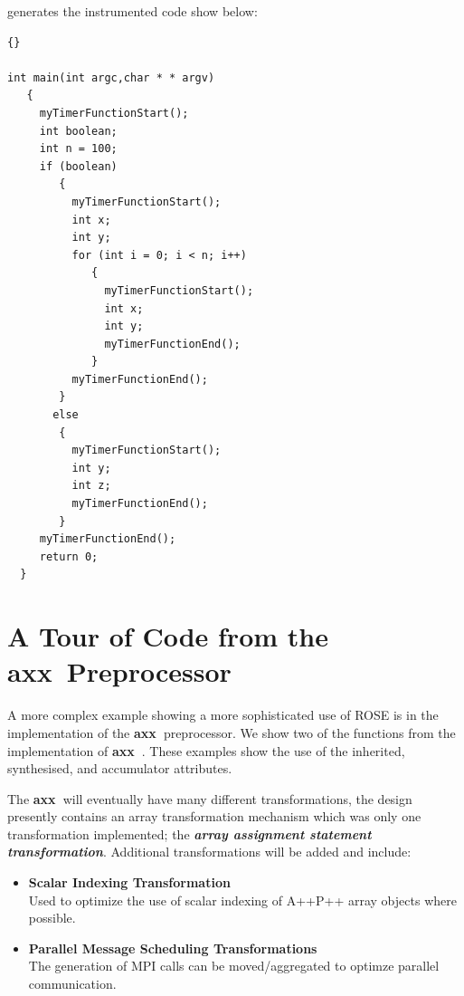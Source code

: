 \documentclass[10pt]{article}
\newcommand{\axx}{{\bf axx\ }}
\begin{document}
\vspace{0.5in}

generates the instrumented code show below:

\begin{lstlisting}{}

int main(int argc,char * * argv)
   { 
     myTimerFunctionStart();
     int boolean; 
     int n = 100; 
     if (boolean)
        { 
          myTimerFunctionStart();
          int x; 
          int y; 
          for (int i = 0; i < n; i++)
             { 
               myTimerFunctionStart();
               int x; 
               int y; 
               myTimerFunctionEnd(); 
             } 
          myTimerFunctionEnd(); 
        } 
       else
        { 
          myTimerFunctionStart();
          int y; 
          int z; 
          myTimerFunctionEnd(); 
        } 
     myTimerFunctionEnd();
     return 0;
  }

\end{lstlisting}


\section{A Tour of Code from the \axx Preprocessor}

   A more complex example showing a more sophisticated use of ROSE is in the implementation
of the \axx preprocessor.  We show two of the functions from the implementation of \axx.
These examples show the use of the inherited, synthesised, and accumulator attributes.

   The \axx will eventually have many different transformations, the design presently contains an
array transformation mechanism which was only one transformation implemented; the {\bf {\it array assignment
statement transformation}}. Additional transformations will be added and include:

\begin{itemize}
     \item {\bf Scalar Indexing Transformation} \\ Used to optimize the use of scalar indexing of
     A++\/P++ array objects where possible.

     \item {\bf Parallel Message Scheduling Transformations} \\ The generation of MPI calls can be moved/aggregated to optimze parallel communication.
\end{itemize}
\end{document}
